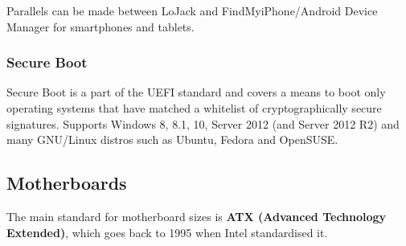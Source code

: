 \documentclass{article}
\begin{document}
Parallels can be made between LoJack and FindMyiPhone/Android Device Manager for smartphones and tablets.

\subsubsection{Secure Boot}

Secure Boot is a part of the UEFI standard and covers a means to boot only operating systems that have matched a whitelist of cryptographically secure signatures. Supports Windows 8, 8.1, 10, Server 2012 (and Server 2012 R2) and many GNU/Linux distros such as Ubuntu, Fedora and OpenSUSE.

\subsection{Motherboards}


The main standard for motherboard sizes is \textbf{ATX (Advanced Technology Extended)}, which goes back to 1995 when Intel standardised it.
\end{document}
